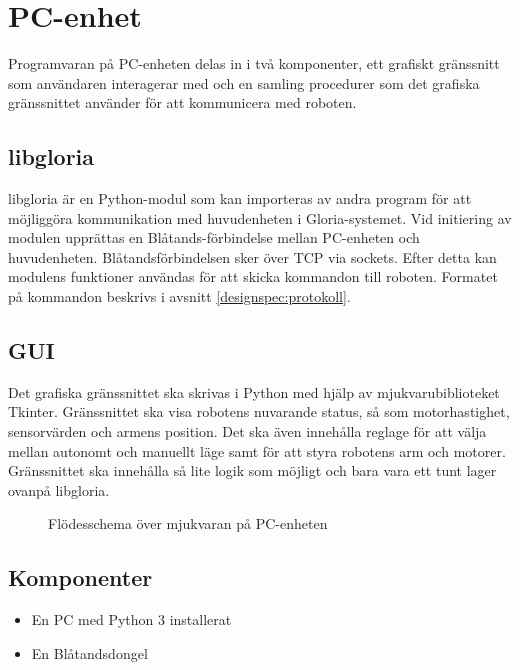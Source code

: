 \section{PC-enhet}
Programvaran på PC-enheten delas in i två komponenter, ett grafiskt gränssnitt som användaren interagerar med och en samling procedurer som det grafiska gränssnittet använder för att kommunicera med roboten. 

\subsection{libgloria}
libgloria är en Python-modul som kan importeras av andra program för att möjliggöra kommunikation med huvudenheten i Gloria-systemet. Vid initiering av modulen upprättas en Blåtands-förbindelse mellan PC-enheten och huvudenheten. Blåtandsförbindelsen sker över TCP via sockets. Efter detta kan modulens funktioner användas för att skicka kommandon till roboten. Formatet på kommandon beskrivs i avsnitt \ref{designspec:protokoll}.

\subsection{GUI}
Det grafiska gränssnittet ska skrivas i Python med hjälp av mjukvarubiblioteket Tkinter. Gränssnittet ska visa robotens nuvarande status, så som motorhastighet, sensorvärden och armens position. Det ska även innehålla reglage för att välja mellan autonomt och manuellt läge samt för att styra robotens arm och motorer. Gränssnittet ska innehålla så lite logik som möjligt och bara vara ett tunt lager ovanpå libgloria.

\begin{figure}[h]
  \centerline{\scalebox{0.8}{}}
  \caption{Flödesschema över mjukvaran på PC-enheten}
\end{figure}

\subsection{Komponenter}
\begin{itemize}
\item En PC med Python 3 installerat
\item En Blåtandsdongel
\end{itemize}
